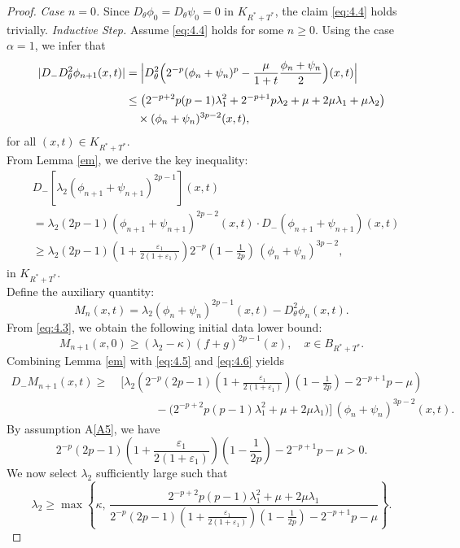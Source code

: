 \documentclass[
  sn-mathphys-num,
  colorlinks,
  linkcolor=darkmagenta,
  citecolor=rufous,
  urlcolor=zaffre,
  hypertexnames=false
]{sn-jnl}
\numberwithin{equation}{section}
\begin{document}
\begin{proof}
\noindent\textit{Case $n=0$.} 
Since $D_\theta\phi_0 = D_\theta\psi_0 = 0$ in $K_{R^{*}+T^{*}}$, the claim \eqref{eq:4.4} holds trivially.
\noindent\textit{Inductive Step.} 
Assume \eqref{eq:4.4} holds for some $n \geq 0$. Using the case $\alpha=1$, we infer that
\begin{equation}\label{eq:4.5}
\begin{aligned}
|D_-D_\theta^{2}\phi_{n+1}(x,t)|
&= \Bigl| D_\theta^{2} \Bigl(2^{-p}(\phi_n+\psi_n)^p - \frac{\mu}{1+t} \frac{\phi_n+\psi_n}{2}\Bigr)(x,t) \Bigr| \\[4pt]
&\leq \bigl(2^{-p+2} p(p-1) \lambda_1^{2} + 2^{-p+1} p\lambda_2 + \mu  + 2\mu \lambda_1 + \mu \lambda_2 \bigr) \\
&\quad \times (\phi_n + \psi_n)^{3p-2}(x,t),
\end{aligned}
\end{equation}
for all $(x,t) \in K_{R^{*}+T^{*}}$.\\
From Lemma \ref{em}, we derive the key inequality:
\begin{equation}\label{eq:4.6}
\begin{aligned}
&D_-\left[\lambda_2(\phi_{n+1}+\psi_{n+1})^{2p-1}\right](x,t) \\
&= \lambda_2(2p-1)(\phi_{n+1}+\psi_{n+1})^{2p-2}(x,t) \cdot D_-(\phi_{n+1}+\psi_{n+1})(x,t) \\
&\geq \lambda_2(2p-1)\!\left(1+\frac{\varepsilon_1}{2(1+\varepsilon_1)}\right)
2^{-p}\!\left(1-\frac{1}{2p}\right)\,
(\phi_n+\psi_n)^{3p-2},
\end{aligned}
\end{equation}
 in $K_{R^{*}+T^{*}}$.\\
Define the auxiliary quantity:
$$
M_n(x,t) = \lambda_2(\phi_n+\psi_n)^{2p-1}(x,t) - D_\theta^{2}\phi_n(x,t).
$$
From  \eqref{eq:4.3}, we obtain the following initial data lower bound:
\begin{equation}\label{eq:4.7}
M_{n+1}(x,0) \geq (\lambda_2 - \kappa)(f+g)^{2p-1}(x), \quad x\in B_{R^{*}+T^{*}}.
\end{equation}
Combining Lemma \ref{em} with \eqref{eq:4.5} and \eqref{eq:4.6} yields
\begin{equation}\label{eq:4.8}
\begin{aligned}
D_- M_{n+1}(x,t) \ge\;&
\Bigg[
\lambda_2\!\left(
2^{-p}(2p-1)\!\left(1+\frac{\varepsilon_1}{2(1+\varepsilon_1)}\right)\!\left(1-\frac{1}{2p}\right)
-2^{-p+1}p-\mu
\right) \\
&\qquad\quad
-\Big(2^{-p+2}p(p-1)\lambda_1^{2}+\mu+2\mu\lambda_1\Big)
\Bigg]\,(\phi_n+\psi_n)^{3p-2}(x,t).
\end{aligned}
\end{equation}
By assumption A\ref{A5}, we have
$$
2^{-p}(2p-1)\!\left(1+\frac{\varepsilon_1}{2(1+\varepsilon_1)}\right)\!\left(1-\frac{1}{2p}\right)
-2^{-p+1}p-\mu >0.
$$
We now select $\lambda_2$ sufficiently large such that
\begin{equation}\label{eq:4.C2-choice}
\lambda_2 \geq \max\left\{
\kappa,\,
\frac{2^{-p+2}p(p-1)\lambda_1^{2}+\mu+2\mu\lambda_1}{2^{-p}(2p-1)\!\left(1+\frac{\varepsilon_1}{2(1+\varepsilon_1)}\right)\!\left(1-\frac{1}{2p}\right)
-2^{-p+1}p-\mu }
\right\}.
\end{equation}



\end{proof}
\end{document}
